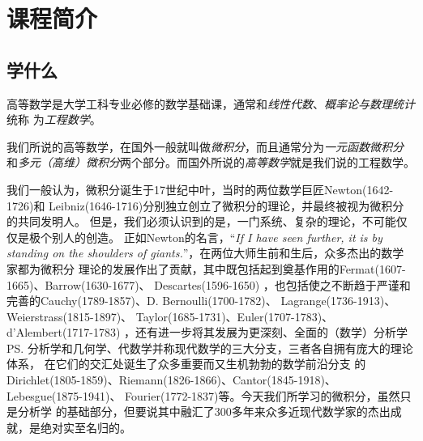 \section{课程简介}

\subsection{学什么}

高等数学是大学工科专业必修的数学基础课，通常和{\it 线性代数}、{\it 概率论与数理统计}统称
为{\it 工程数学}。

我们所说的高等数学，在国外一般就叫做{\it 微积分}，而且通常分为{\it 一元函数微积分}
和{\it 多元（高维）微积分}两个部分。而国外所说的{\it 高等数学}就是我们说的工程数学。

我们一般认为，微积分诞生于17世纪中叶，当时的两位数学巨匠Newton(1642-1726)和
Leibniz(1646-1716)分别独立创立了微积分的理论，并最终被视为微积分的共同发明人。
但是，我们必须认识到的是，一门系统、复杂的理论，不可能仅仅是极个别人的创造。
正如Newton的名言，“{\it If I have seen further, it is by standing on 
the shoulders of giants.}”，在两位大师生前和生后，众多杰出的数学家都为微积分
理论的发展作出了贡献，其中既包括起到奠基作用的Fermat(1607-1665)、Barrow(1630-1677)、
Descartes(1596-1650)%
，也包括使之不断趋于严谨和完善的Cauchy(1789-1857)、D. Bernoulli(1700-1782)、
Lagrange(1736-1913)、Weierstrass(1815-1897)、
Taylor(1685-1731)、Euler(1707-1783)、d'Alembert(1717-1783)
，还有进一步将其发展为更深刻、全面的{\kaishu （数学）分析学}
\ps{分析学和几何学、代数学并称现代数学的三大分支，三者各自拥有庞大的理论体系，
在它们的交汇处诞生了众多重要而又生机勃勃的数学前沿分支}
的
Dirichlet(1805-1859)、Riemann(1826-1866)、Cantor(1845-1918)、
Lebesgue(1875-1941)、
Fourier(1772-1837)等。今天我们所学习的微积分，虽然只是分析学
的基础部分，但要说其中融汇了300多年来众多近现代数学家的杰出成就，是绝对实至名归的。



%	

